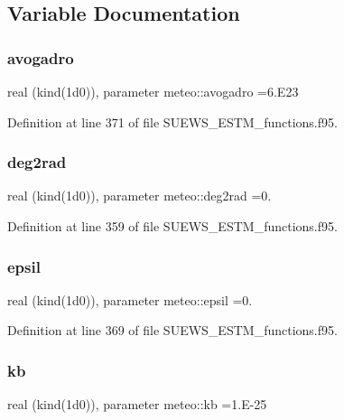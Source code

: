 \subsection{Variable Documentation}
\mbox{\label{namespacemeteo_aaf725e1853e17e82e0db242dcf619c15}} 
\subsubsection{\texorpdfstring{avogadro}{avogadro}}
{\footnotesize\ttfamily real (kind(1d0)), parameter meteo\+::avogadro =6.\+E23}



Definition at line 371 of file S\+U\+E\+W\+S\+\_\+\+E\+S\+T\+M\+\_\+functions.\+f95.

\mbox{\label{namespacemeteo_a6acb74c9a7ddfe85ba69112897754791}} 
\subsubsection{\texorpdfstring{deg2rad}{deg2rad}}
{\footnotesize\ttfamily real (kind(1d0)), parameter meteo\+::deg2rad =0.}



Definition at line 359 of file S\+U\+E\+W\+S\+\_\+\+E\+S\+T\+M\+\_\+functions.\+f95.

\mbox{\label{namespacemeteo_a63de0dfce55a22ba48600ea13d0e216d}} 
\subsubsection{\texorpdfstring{epsil}{epsil}}
{\footnotesize\ttfamily real (kind(1d0)), parameter meteo\+::epsil =0.}



Definition at line 369 of file S\+U\+E\+W\+S\+\_\+\+E\+S\+T\+M\+\_\+functions.\+f95.

\mbox{\label{namespacemeteo_a4ac27cf4384cebc39c7c0ec998ec5579}} 
\subsubsection{\texorpdfstring{kb}{kb}}
{\footnotesize\ttfamily real (kind(1d0)), parameter meteo\+::kb =1.\+E-\/25}




